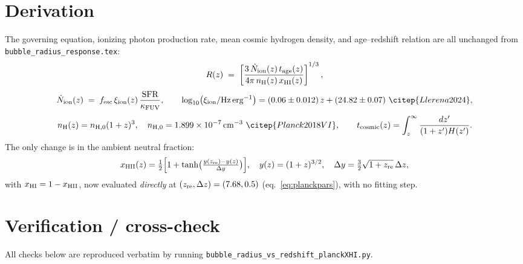 \documentclass[11pt,a4paper]{article}
\newcommand{\Ndot}{\dot{N}_{\rm ion}}
\newcommand{\nH}{n_{\rm H}}
\begin{document}
\section{Derivation}
\label{sec:derivation}

The governing equation, ionizing photon production rate, mean cosmic hydrogen density, and age--redshift
relation are all unchanged from \texttt{bubble\_radius\_response.tex}:
\begin{equation}
  R(z) \;=\; \left[\frac{3\,\Ndot(z)\,t_{\rm age}(z)}{4\pi\,\nH(z)\,x_{\rm HI}(z)}\right]^{1/3},
  \label{eq:R}
\end{equation}
\begin{equation}
  \Ndot(z) \;=\; f_{\rm esc}\,\xi_{\rm ion}(z)\,\frac{\mathrm{SFR}}{\kappa_{\rm FUV}}, \qquad
  \log_{10}\!\left(\xi_{\rm ion}/{\rm Hz\,erg^{-1}}\right) = (0.06\pm0.012)\,z + (24.82\pm0.07)
  \ \citep{Llerena2024},
  \label{eq:Ndot}
\end{equation}
\begin{equation}
  \nH(z) = n_{{\rm H},0}(1+z)^3,\quad n_{{\rm H},0}=1.899\times10^{-7}\,{\rm cm^{-3}}\ \citep{Planck2018VI},
  \qquad
  t_{\rm cosmic}(z)=\int_z^\infty\frac{dz'}{(1+z')H(z')}.
  \label{eq:nH_age}
\end{equation}
The only change is in the ambient neutral fraction:
\begin{equation}
  x_{\rm HII}(z) = \tfrac12\Bigl[1+\tanh\bigl(\tfrac{y(z_{\rm re})-y(z)}{\Delta y}\bigr)\Bigr], \quad
  y(z)=(1+z)^{3/2}, \quad \Delta y = \tfrac32\sqrt{1+z_{\rm re}}\,\Delta z,
  \label{eq:tanh}
\end{equation}
with $x_{\rm HI}=1-x_{\rm HII}$, now evaluated \emph{directly} at $(z_{\rm re},\Delta z)=(7.68,0.5)$
\citep{Planck2018VI} (eq.~\ref{eq:planckpars}), with no fitting step.

\section{Verification / cross-check}
\label{sec:verification}

All checks below are reproduced verbatim by running \texttt{bubble\_radius\_vs\_redshift\_planckXHI.py}.
\end{document}
